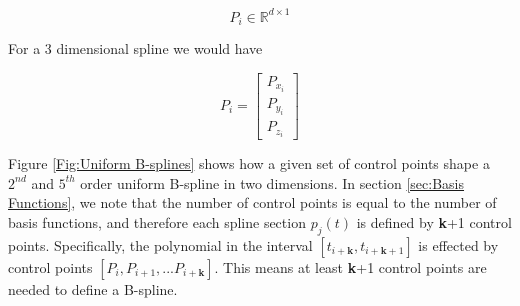 \documentclass{article}
\begin{document}
 \begin{equation}
     P_i \in \mathbb{R}^{d \times 1}
 \end{equation}
 
For a 3 dimensional spline we would have
 
  \begin{equation}
     P_i = \begin{bmatrix} P_{x_i} \\ P_{y_i} \\ P_{z_i} \end{bmatrix}
 \end{equation}
 
 Figure \ref{Fig:Uniform B-splines} shows how a given set of control points shape a \(2^{nd}\) and \(5^{th}\) order uniform B-spline in two dimensions. In section \ref{sec:Basis Functions}, we note that the number of control points is equal to the number of basis functions, and therefore each spline section \(p_j(t)\) is defined by \textbf{k}+1 control points. Specifically, the polynomial in the interval \([t_{i+\textbf{k}} , t_{i+\textbf{k}+1}]\) is effected by control points \([P_i , P_{i+1}, ... P_{i+\textbf{k}}]\). This means at least \textbf{k}+1 control points are needed to define a B-spline.
\end{document}

